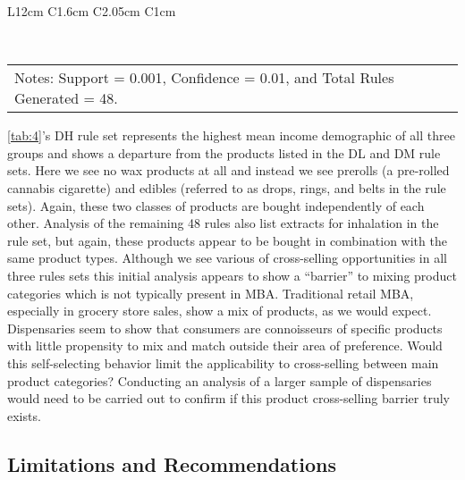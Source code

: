 \documentclass[../article.tex, 12pt]{subfiles}
\begin{document}
\begin{multicols*}{2}
\begin{table*}
{\begin{tabular*}{\linewidth}{
      L{12cm}
      C{1.6cm}
      C{2.05cm}
      C{1cm}
    }
      \bottomrule[0.5pt]
    \end{tabular*}%
  }
\vspace{0.001\baselineskip}\\
\begin{tabular*}{\linewidth}{llll}
\multicolumn{4}{l}{\scriptsize Notes: Support = 0.001, Confidence = 0.01, and Total Rules Generated = 48.}
\end{tabular*}%
\end{table*}

\par
\autoref{tab:4}'s DH rule set represents the highest mean income demographic of all three groups and shows a departure from the products listed in the DL and DM rule sets. Here we see no wax products at all and instead we see prerolls (a pre-rolled cannabis cigarette) and edibles (referred to as drops, rings, and belts in the rule sets). Again, these two classes of products are bought independently of each other. Analysis of the remaining 48 rules also list extracts for inhalation in the rule set, but again, these products appear to be bought in combination with the same product types. Although we see various of cross-selling opportunities in all three rules sets this initial analysis appears to show a ``barrier'' to mixing product categories which is not typically present in MBA. Traditional retail MBA, especially in grocery store sales, show a mix of products, as we would expect. Dispensaries seem to show that consumers are connoisseurs of specific products with little propensity to mix and match outside their area of preference. Would this self-selecting behavior limit the applicability to cross-selling between main product categories? Conducting an analysis of a larger sample of dispensaries would need to be carried out to confirm if this product cross-selling barrier truly exists.

\subsection{Limitations and Recommendations}


\end{multicols*}
\end{document}

